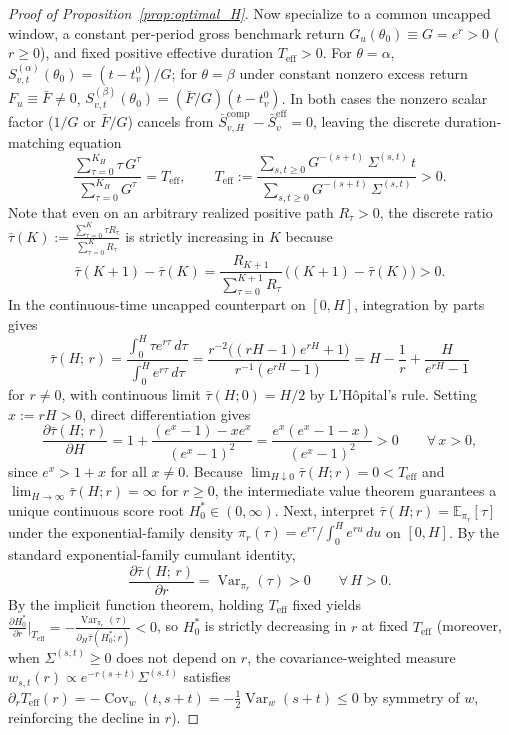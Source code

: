 \begin{proof}[Proof of Proposition~\ref{prop:optimal_H}]
Now specialize to a common uncapped window, a constant per-period gross benchmark return $G_u(\theta_0) \equiv G = e^r > 0$ ($r \ge 0$), and fixed positive effective duration $T_{\mathrm{eff}} > 0$.
For $\theta = \alpha$, $S_{v,t}^{(\alpha)}(\theta_0) = (t - t_v^0)/G$; for $\theta = \beta$ under constant nonzero excess return $F_u \equiv \bar{F} \neq 0$, $S_{v,t}^{(\beta)}(\theta_0) = (\bar{F}/G)(t - t_v^0)$.
In both cases the nonzero scalar factor ($1/G$ or $\bar{F}/G$) cancels from $\bar{S}_{v,H}^{\mathrm{comp}} - \bar{S}_v^{\mathrm{eff}} = 0$, leaving the discrete duration-matching equation
\[
\frac{\sum_{\tau=0}^{K_H} \tau\,G^\tau}{\sum_{\tau=0}^{K_H} G^\tau} = T_{\mathrm{eff}},
\qquad
T_{\mathrm{eff}} := \frac{\sum_{s,t\ge 0} G^{-(s+t)}\,\Sigma^{(s,t)}\,t}{\sum_{s,t\ge 0} G^{-(s+t)}\,\Sigma^{(s,t)}} > 0.
\]
Note that even on an arbitrary realized positive path $R_\tau > 0$, the discrete ratio $\bar\tau(K) := \frac{\sum_{\tau=0}^K \tau R_\tau}{\sum_{\tau=0}^K R_\tau}$ is strictly increasing in $K$ because
\[
\bar\tau(K+1) - \bar\tau(K)
= \frac{R_{K+1}}{\sum_{\tau=0}^{K+1} R_\tau}\,\bigl((K+1) - \bar\tau(K)\bigr) > 0.
\]
In the continuous-time uncapped counterpart on $[0,H]$, integration by parts gives
\[
\bar\tau(H;\,r)
= \frac{\int_0^H \tau e^{r\tau}\,d\tau}{\int_0^H e^{r\tau}\,d\tau}
= \frac{r^{-2}\bigl((rH - 1)e^{rH} + 1\bigr)}{r^{-1}(e^{rH} - 1)}
= H - \frac{1}{r} + \frac{H}{e^{rH} - 1}
\]
for $r \neq 0$, with continuous limit $\bar\tau(H;0) = H/2$ by L'H\^opital's rule.
Setting $x := rH > 0$, direct differentiation gives
\[
\frac{\partial \bar\tau(H;\,r)}{\partial H}
= 1 + \frac{(e^x - 1) - x e^x}{(e^x - 1)^2}
= \frac{e^x(e^x - 1 - x)}{(e^x - 1)^2} > 0 \qquad \forall\, x > 0,
\]
since $e^x > 1 + x$ for all $x \neq 0$.
Because $\lim_{H\downarrow 0}\bar\tau(H;r) = 0 < T_{\mathrm{eff}}$ and $\lim_{H\to\infty}\bar\tau(H;r) = \infty$ for $r \ge 0$, the intermediate value theorem guarantees a unique continuous score root $H_0^\ast \in (0,\infty)$.
Next, interpret $\bar\tau(H;r) = \mathbb{E}_{\pi_r}[\tau]$ under the exponential-family density $\pi_r(\tau) = e^{r\tau}/\int_0^H e^{ru}\,du$ on $[0,H]$.
By the standard exponential-family cumulant identity,
\[
\frac{\partial \bar\tau(H;\,r)}{\partial r} = \operatorname{Var}_{\pi_r}(\tau) > 0 \qquad \forall\, H > 0.
\]
By the implicit function theorem, holding $T_{\mathrm{eff}}$ fixed yields $\frac{\partial H_0^\ast}{\partial r}\big|_{T_{\mathrm{eff}}} = -\frac{\operatorname{Var}_{\pi_r}(\tau)}{\partial_H \bar\tau(H_0^\ast;r)} < 0$, so $H_0^\ast$ is strictly decreasing in $r$ at fixed $T_{\mathrm{eff}}$ (moreover, when $\Sigma^{(s,t)} \ge 0$ does not depend on $r$, the covariance-weighted measure $w_{s,t}(r) \propto e^{-r(s+t)}\Sigma^{(s,t)}$ satisfies $\partial_r T_{\mathrm{eff}}(r) = -\operatorname{Cov}_w(t, s+t) = -\frac{1}{2}\operatorname{Var}_w(s+t) \le 0$ by symmetry of $w$, reinforcing the decline in $r$).

\end{proof}
